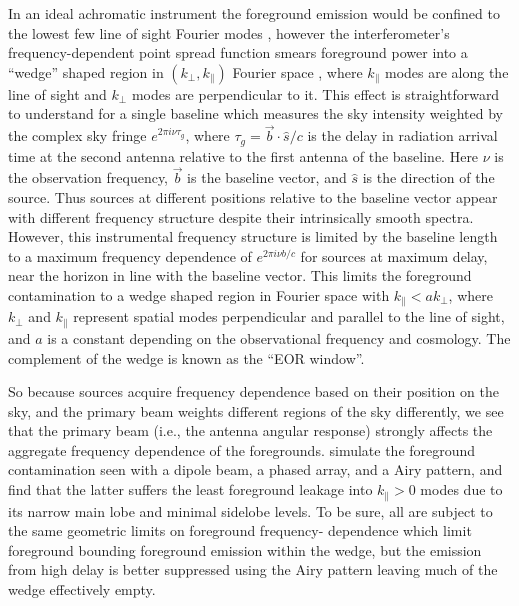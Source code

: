 \documentclass{emulateapj}
\begin{document}
In an ideal achromatic instrument the foreground emission would be confined to the lowest few 
line of sight Fourier modes \citep[e.g.,][]{MoralesBowmanHewittFGsub}, however  the  
interferometer's frequency-dependent point spread function smears foreground power into a ``wedge'' shaped 
region in $(k_\perp,k_\parallel)$ Fourier space \citep{Dattapowerspec,X13, PoberWedge,MoralesPSShapes, VedanthamWedge, nithya13, CathWedge, AdrianWedge1, AdrianWedge2,parsons12b}, where $k_\parallel$ modes are along the line of sight and $k_\perp$ modes are perpendicular to it. This effect is straightforward to understand for a single baseline which measures the sky intensity weighted by the complex sky fringe 
$e^{2\pi i \nu \tau_g}$, where $\tau_g=\vec{b}\cdot\hat{s}/c$ is the delay in radiation arrival time at the second antenna relative to the first antenna of the baseline. Here $\nu$ is the observation frequency, $\vec{b}$ is the baseline vector, and $\hat{s}$ is the direction of the source. 
 Thus sources at different positions relative to the baseline vector appear with different 
frequency structure despite their intrinsically smooth spectra. However, this instrumental frequency structure is limited 
by the baseline length to a maximum frequency dependence of  $e^{2\pi i \nu b/c}$ for sources at maximum delay, near the horizon in line with the baseline vector. This limits the foreground contamination 
to a wedge shaped region in Fourier space with $k_\parallel<a k_\perp$, where $k_\perp$ and $k_\parallel$ represent spatial modes 
perpendicular and parallel to the line of sight, and $a$ is a constant depending on the observational frequency and cosmology. The complement of the wedge is known as the ``EOR window''.

So because sources acquire frequency dependence based on their position on the sky, and the primary beam weights different regions of the sky differently, we see that the primary beam (i.e., the antenna angular response) strongly affects the aggregate frequency dependence 
of the foregrounds. \citet{nithya15} simulate the foreground contamination seen with a dipole beam, a phased array, and a Airy pattern,
and find that the latter suffers the least foreground leakage into
 $k_\parallel>0$ modes due to its narrow main lobe and minimal sidelobe 
levels. To be sure, all are subject to the same geometric limits on foreground frequency-
dependence which limit foreground bounding foreground emission within the wedge, but the emission from high delay is better suppressed using the 
Airy pattern leaving much of the wedge effectively empty. 
\end{document}
